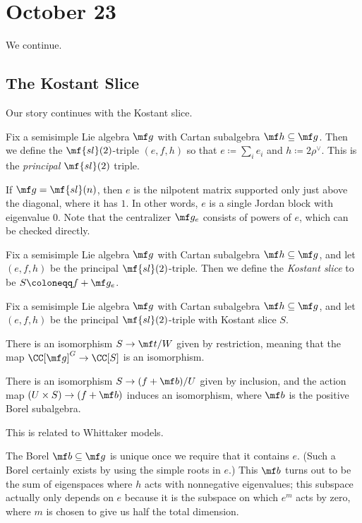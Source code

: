 \documentclass[../notes.tex]{subfiles}
\begin{document}
\section{October 23}
We continue.

\subsection{The Kostant Slice}
Our story continues with the Kostant slice.
\begin{definition}
	Fix a semisimple Lie algebra $\mf g$ with Cartan subalgebra $\mf h\subseteq\mf g$. Then we define the $\mf{sl}(2)$-triple $(e,f,h)$ so that $e\coloneqq\sum_ie_i$ and $h\coloneqq2\rho^\lor$. This is the \textit{principal $\mf{sl}(2)$} triple.
\end{definition}
\begin{example}
	If $\mf g=\mf{sl}(n)$, then $e$ is the nilpotent matrix supported only just above the diagonal, where it has $1$. In other words, $e$ is a single Jordan block with eigenvalue $0$. Note that the centralizer $\mf g_e$ consists of powers of $e$, which can be checked directly.
\end{example}
\begin{definition}
	Fix a semisimple Lie algebra $\mf g$ with Cartan subalgebra $\mf h\subseteq\mf g$, and let $(e,f,h)$ be the principal $\mf{sl}(2)$-triple. Then we define the \textit{Kostant slice} to be $S\coloneqq f+\mf g_e$.
\end{definition}
\begin{theorem} \label{thm:kostant-slice}
	Fix a semisimple Lie algebra $\mf g$ with Cartan subalgebra $\mf h\subseteq\mf g$, and let $(e,f,h)$ be the principal $\mf{sl}(2)$-triple with Kostant slice $S$.
	\begin{listalph}
		\item There is an isomorphism $S\to\mf t/W$ given by restriction, meaning that the map $\CC[\mf g]^G\to\CC[S]$ is an isomorphism.
		\item There is an isomorphism $S\to(f+\mf b)/U$ given by inclusion, and the action map $(U\times S)\to(f+\mf b)$ induces an isomorphism, where $\mf b$ is the positive Borel subalgebra.
	\end{listalph}
\end{theorem}
\begin{remark}
	This is related to Whittaker models.
\end{remark}
\begin{remark}
	The Borel $\mf b\subseteq\mf g$ is unique once we require that it contains $e$. (Such a Borel certainly exists by using the simple roots in $e$.) This $\mf b$ turns out to be the sum of eigenspaces where $h$ acts with nonnegative eigenvalues; this subspace actually only depends on $e$ because it is the subspace on which $e^m$ acts by zero, where $m$ is chosen to give us half the total dimension.
\end{remark}
\end{document}
